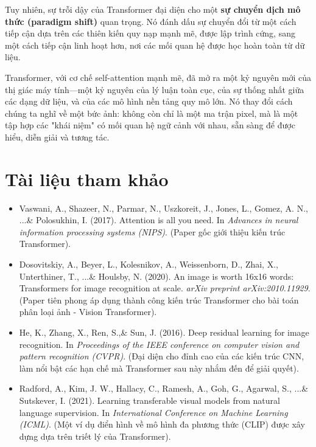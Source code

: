 Tuy nhiên, sự trỗi dậy của Transformer đại diện cho một \textbf{sự chuyển dịch mô thức (paradigm shift)} quan trọng. Nó đánh dấu sự chuyển đổi từ một cách tiếp cận dựa trên các thiên kiến quy nạp mạnh mẽ, được lập trình cứng, sang một cách tiếp cận linh hoạt hơn, nơi các mối quan hệ được học hoàn toàn từ dữ liệu.

Transformer, với cơ chế self-attention mạnh mẽ, đã mở ra một kỷ nguyên mới của thị giác máy tính—một kỷ nguyên của lý luận toàn cục, của sự thống nhất giữa các dạng dữ liệu, và của các mô hình nền tảng quy mô lớn. Nó thay đổi cách chúng ta nghĩ về một bức ảnh: không còn chỉ là một ma trận pixel, mà là một tập hợp các "khái niệm" có mối quan hệ ngữ cảnh với nhau, sẵn sàng để được hiểu, diễn giải và tương tác.

\section*{Tài liệu tham khảo}
\begin{itemize}
	\item[1] Vaswani, A., Shazeer, N., Parmar, N., Uszkoreit, J., Jones, L., Gomez, A. N., ...\& Polosukhin, I. (2017). Attention is all you need. In \textit{Advances in neural information processing systems (NIPS)}. (Paper gốc giới thiệu kiến trúc Transformer).
	\item[2] Dosovitskiy, A., Beyer, L., Kolesnikov, A., Weissenborn, D., Zhai, X., Unterthiner, T., ...\& Houlsby, N. (2020). An image is worth 16x16 words: Transformers for image recognition at scale. \textit{arXiv preprint arXiv:2010.11929}. (Paper tiên phong áp dụng thành công kiến trúc Transformer cho bài toán phân loại ảnh - Vision Transformer).
	\item[3] He, K., Zhang, X., Ren, S.,\& Sun, J. (2016). Deep residual learning for image recognition. In \textit{Proceedings of the IEEE conference on computer vision and pattern recognition (CVPR)}. (Đại diện cho đỉnh cao của các kiến trúc CNN, làm nổi bật các hạn chế mà Transformer sau này nhắm đến để giải quyết).
	\item[4] Radford, A., Kim, J. W., Hallacy, C., Ramesh, A., Goh, G., Agarwal, S., ...\& Sutskever, I. (2021). Learning transferable visual models from natural language supervision. In \textit{International Conference on Machine Learning (ICML)}. (Một ví dụ điển hình về mô hình đa phương thức (CLIP) được xây dựng dựa trên triết lý của Transformer).
\end{itemize}